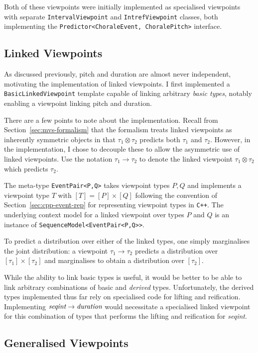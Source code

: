 \documentclass[12pt,a4paper,twoside,openright]{report}
\newcommand{\sref}[1]{Section~\ref{#1}}
\begin{document}
Both of these viewpoints were initially implemented as specialised viewpoints
with separate \texttt{IntervalViewpoint} and \texttt{IntrefViewpoint} classes,
both implementing the \texttt{Predictor<ChoraleEvent, ChoralePitch>} interface.

\subsection{Linked Viewpoints}\label{sec:impl-linked-vps}

As discussed previously, pitch and duration are almost never independent,
motivating the implementation of linked viewpoints. I first implemented a
\texttt{BasicLinkedViewpoint} template capable of linking arbitrary \emph{basic
types}, notably enabling a viewpoint linking pitch and duration.

There are a few points to note about the implementation. Recall from
\sref{sec:mvs-formalism} that the formalism treats linked viewpoints as
inherently symmetric objects in that $\tau_1 \otimes \tau_2$ predicts both
$\tau_1$ and $\tau_2$. However, in the implementation, I chose to decouple these
to allow the asymmetric use of linked viewpoints. Use the notation $\tau_1
\rightarrow \tau_2$ to denote the linked viewpoint $\tau_1 \otimes \tau_2$ which
predicts $\tau_2$.

The meta-type \texttt{EventPair<P,Q>} takes viewpoint types $P,Q$ and implements
a viewpoint type $T$ with $[T] = [P] \times [Q]$ following the convention of
\sref{sec:cpp-event-rep} for representing viewpoint types in
\texttt{C++}. The underlying context model for a linked viewpoint over types $P$
and $Q$ is an instance of \texttt{SequenceModel<EventPair<P,Q>>}.

To predict a distribution over either of the linked types, one simply
marginalises the joint distribution: a viewpoint $\tau_1 \rightarrow \tau_2$
predicts a distribution over $[\tau_1] \times [\tau_2]$ and marginalises to
obtain a distribution over $[\tau_2]$.

While the ability to link basic types is useful, it would be better to be able
to link arbitrary combinations of basic and \emph{derived} types. Unfortunately,
the derived types implemented thus far rely on specialised code for lifting and
reification. Implementing $\emph{seqint} \rightarrow \emph{duration}$ would
necessitate a specialised linked viewpoint for this combination of types that
performs the lifting and reification for \emph{seqint}.

\subsection{Generalised Viewpoints}
\end{document}
